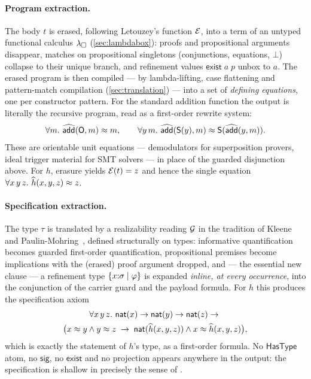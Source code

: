 \paragraph{Program extraction.}  The body $t$ is erased, following
Letouzey's function $\mathcal{E}$, into a term of an untyped functional
calculus $\lambda_{\square}$ (\cref{sec:lambdabox}): proofs and propositional arguments
disappear, matches on propositional singletons (conjunctions, equations,
$\bot$) collapse to their unique branch, and refinement values
$\mathsf{exist}\;a\;p$ unbox to $a$.  The erased program is then compiled
--- by lambda-lifting, case flattening and pattern-match compilation
(\cref{sec:translation}) --- into a set of \emph{defining equations}, one
per constructor pattern.  For the standard addition function the output is
literally the recursive program, read as a first-order rewrite system:
\[
  \forall m.\ \widehat{\mathsf{add}}(\mathsf{O}, m) \approx m,
  \qquad
  \forall y\,m.\ \widehat{\mathsf{add}}(\mathsf{S}(y), m) \approx \mathsf{S}(\widehat{\mathsf{add}}(y, m)).
\]
These are orientable unit equations --- demodulators for superposition
provers, ideal trigger material for SMT solvers --- in place of the guarded
disjunction above.  For $h$, erasure yields $\mathcal{E}(t) = z$ and hence the
single equation $\forall x\,y\,z.\ \Ihat{h}(x,y,z) \feq z$.

\paragraph{Specification extraction.}  The type $\tau$ is translated by a
realizability reading $\mathcal{G}$ in the tradition of
Kleene~\cite{Kleene1945} and Paulin-Mohring~\cite{PaulinMohring1989},
defined structurally on types: informative quantification becomes guarded
first-order quantification, propositional premises become implications with
the (erased) proof argument dropped, and --- the essential new clause ---
a refinement type $\{x{:}\sigma \mid \varphi\}$ is expanded \emph{inline,
at every occurrence}, into the conjunction of the carrier guard and the
payload formula.  For $h$ this produces the specification axiom
\begin{multline*}
  \forall x\,y\,z.\ \mathsf{nat}(x) \to \mathsf{nat}(y) \to \mathsf{nat}(z) \to{}\\
    \bigl(x \approx y \wedge y \approx z \;\to\;
      \mathsf{nat}(\widehat{h}(x,y,z)) \wedge x \approx \widehat{h}(x,y,z)\bigr),
\end{multline*}
which is exactly the statement of $h$'s type, as a first-order formula.  No
$\mathsf{HasType}$ atom, no $\mathsf{sig}$, no $\mathsf{exist}$ and no
projection appears anywhere in the output: the specification is shallow in
precisely the sense of \cite[\S 1.1]{Czajka2018}.

